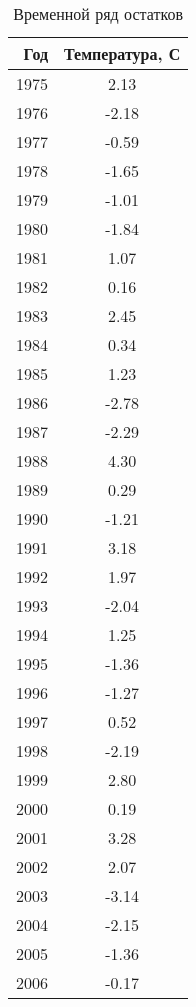 \begin{table}[H]
\centering
\caption{Временной ряд остатков} 
\label{table:residuals}
\begin{tabular}{|rc|}
  \hline
Год & Температура, С \\ 
  \hline
1975 & 2.13 \\ 
  1976 & -2.18 \\ 
  1977 & -0.59 \\ 
  1978 & -1.65 \\ 
  1979 & -1.01 \\ 
  1980 & -1.84 \\ 
  1981 & 1.07 \\ 
  1982 & 0.16 \\ 
  1983 & 2.45 \\ 
  1984 & 0.34 \\ 
  1985 & 1.23 \\ 
  1986 & -2.78 \\ 
  1987 & -2.29 \\ 
  1988 & 4.30 \\ 
  1989 & 0.29 \\ 
  1990 & -1.21 \\ 
  1991 & 3.18 \\ 
  1992 & 1.97 \\ 
  1993 & -2.04 \\ 
  1994 & 1.25 \\ 
  1995 & -1.36 \\ 
  1996 & -1.27 \\ 
  1997 & 0.52 \\ 
  1998 & -2.19 \\ 
  1999 & 2.80 \\ 
  2000 & 0.19 \\ 
  2001 & 3.28 \\ 
  2002 & 2.07 \\ 
  2003 & -3.14 \\ 
  2004 & -2.15 \\ 
  2005 & -1.36 \\ 
  2006 & -0.17 \\ 
   \hline
\end{tabular}
\end{table}
